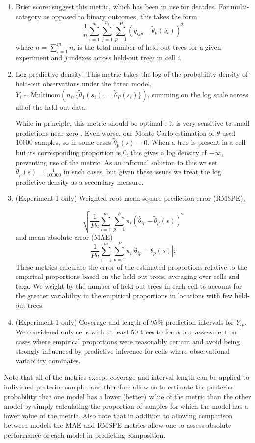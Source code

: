 \documentclass[10pt,letterpaper]{article}
\begin{document}
\begin{enumerate}
\item Brier score: \cite{Gnei:etal:2007} suggest this metric, which has
been in use for decades. For multi-category as opposed to binary outcomes,
this takes the form
\[
\frac{1}{n}\sum_{i=1}^{m}\sum_{j=1}^{n_{i}}\sum_{p=1}^{P}(y_{ijp}-\tilde{\theta}_{p}(s_{i}))^{2}
\]
where $n=\sum_{i=1}^{m}n_{i}$ is the total number of held-out trees
for a given experiment and \emph{j} indexes across held-out trees in cell
\emph{i}. 
\item Log predictive density: This metric takes the log of the probability
density of held-out observations under the fitted model, $Y_{i}\sim\mbox{Multinom}(n_{i},\{\tilde{\theta}_{1}(s_{i}),\ldots,\tilde{\theta}_{P}(s_{i})\})$,
summing on the log scale across all of the held-out data. 


While in principle, this metric should be optimal \cite{Krnj:Drap:2014},
it is very sensitive to small predictions near zero \cite{Gnei:etal:2007}.
Even worse, our Monte Carlo estimation of $\theta$ used 10000 samples,
so in some cases $\tilde{\theta}_{p}(s)=0$. When a tree is present
in a cell but its corresponding proportion is 0, this gives a log
density of $-\infty$, preventing use of the metric. As an informal
solution to this we set $\tilde{\theta}_{p}(s)=\frac{1}{100000}$
in such cases, but given these issues we treat the log predictive
density as a secondary measure.

\item (Experiment 1 only) Weighted root mean square prediction error (RMSPE),

\[
\sqrt{\frac{1}{Pn}\sum_{i=1}^{m}\sum_{p=1}^{P}n_{i}(\hat{\theta}_{ip}-\tilde{\theta}_{p}(s))^{2}}
\]
and mean absolute error (MAE)
\[
\frac{1}{Pn}\sum_{i=1}^{m}\sum_{p=1}^{P}n_{i}|\hat{\theta}_{ip}-\tilde{\theta}_{p}(s)|:
\]
These metrics calculate the error of the estimated proportions relative
to the empirical proportions based on the held-out trees, averaging
over cells and taxa. We weight by the number of held-out trees in
each cell to account for the greater variability in the empirical
proportions in locations with few held-out trees. 
\item (Experiment 1 only) Coverage and length of 95\% prediction intervals
for $Y_{ip}$. We considered only cells with at least 50 trees to
focus our assessment on cases where empirical proportions were reasonably
certain and avoid being strongly influenced by predictive inference
for cells where observational variability dominates.
\end{enumerate}
Note that all of the metrics except coverage and interval length can
be applied to individual posterior samples and therefore allow us
to estimate the posterior probability that one model has a lower (better)
value of the metric than the other model by simply calculating the
proportion of samples for which the model has a lower value of the
metric. Also note that in addition to allowing comparison
between models the MAE and RMSPE metrics allow one to assess absolute
performance of each model in predicting composition.
\end{document}
